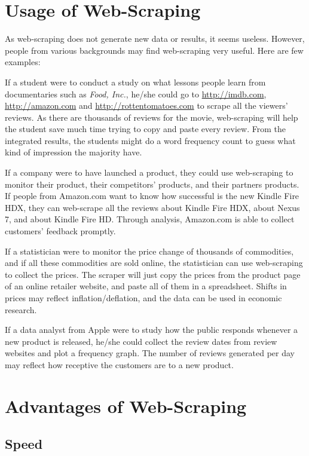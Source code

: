 \documentclass[12pt]{report}
\begin{document}
\section{Usage of Web-Scraping}
As web-scraping does not generate new data or results, it seems useless. However, people from various backgrounds may find web-scraping very useful. Here are few examples:

If a student were to conduct a study on what lessons people learn from documentaries such as \textit{Food, Inc.}, he/she could go to \url{http://imdb.com}, \url{http://amazon.com} and \url{http://rottentomatoes.com} to scrape all the viewers' reviews. As there are thousands of reviews for the movie, web-scraping will help the student save much time trying to copy and paste every review. From the integrated results, the students might do a word frequency count to guess what kind of impression the majority have.

If a company were to have launched a product, they could use web-scraping to monitor their product, their competitors' products, and their partners products. If people from Amazon.com  want to know how successful is the new Kindle Fire HDX, they can web-scrape all the reviews about Kindle Fire HDX, about Nexus 7, and about Kindle Fire HD. Through analysis, Amazon.com is able to collect customers' feedback promptly.

If a statistician were to monitor the price change of thousands of commodities, and if all these commodities are sold online, the statistician can use web-scraping to collect the prices. The scraper will just copy the prices from the product page of an online retailer website, and paste all of them in a spreadsheet. Shifts in prices may reflect inflation/deflation, and the data can be used in economic research.

If a data analyst from Apple were to study how the public responds whenever a new product is released, he/she could collect the review dates from review websites and plot a frequency graph. The number of reviews generated per day may reflect how receptive the customers are to a new product.

\section{Advantages of Web-Scraping}

\subsection{Speed}
\end{document}
